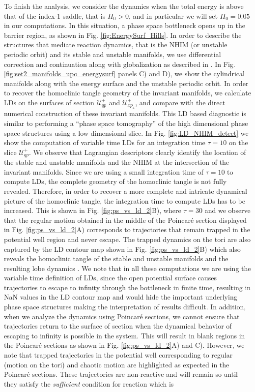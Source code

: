 \documentclass[8pt]{article}
\begin{document}
To finish the analysis, we consider the dynamics when the total energy is above that of the index-1 saddle, that is $H_0 > 0$, and in particular we will set $H_0 = 0.05$ in our computations. In this situation, a phase space bottleneck opens up in the barrier region, as shown in Fig. \ref{fig:EnergySurf_Hills}. In order to describe the structures that mediate reaction dynamics, that is the NHIM (or unstable periodic orbit) and its stable and unstable manifolds, we use differential correction and continuation along with globalization as described in \cite{Koon2011,naik2017geometry,naik2019b,GG2019}. In Fig. \ref{fig:set2_manifolds_upo_energysurf} panels C) and D), we show the cylindrical manifolds along with the energy surface and the unstable periodic orbit. In order to recover the homoclinic tangle geometry of the invariant manifolds, we calculate LDs on the surfaces of section $\mathcal{U}^{+}_{qp}$ and $\mathcal{U}^{+}_{xp_x}$, and compare with the direct numerical construction of these invariant manifolds. This LD based diagnostic is similar to performing a ``phase space tomography'' of the high dimensional phase space structures using a low dimensional slice. In Fig. \ref{fig:LD_NHIM_detect} we show the computation of variable time LDs for an integration time $\tau = 10$ on the slice $\mathcal{U}^{+}_{qp}$. We observe that Lagrangian descriptors clearly identify the location of the stable and unstable manifolds and the NHIM at the intersection of the invariant manifolds. Since we are using a small integration time of $\tau = 10$ to compute LDs, the complete geometry of the homoclinic tangle is not fully revealed. Therefore, in order to recover a more complete and intricate dynamical picture of the homoclinic tangle, the integration time to compute LDs has to be increased. This is shown in Fig. \ref{fig:ps_vs_ld_2}B), where $\tau = 30$ and we observe that the regular motion obtained in the middle of the Poincar\'e section displayed in Fig. \ref{fig:ps_vs_ld_2}A) corresponds to trajectories that remain trapped in the potential well region and never escape. The trapped dynamics on the tori are also captured by the LD contour map shown in Fig. \ref{fig:ps_vs_ld_2}B) which also reveals the homoclinic tangle of the stable and unstable manifolds and the resulting lobe dynamics \cite{beigie1992}. We note that in all these computations we are using the variable time definition of LDs, since the open potential surface causes trajectories to escape to infinity through the bottleneck in finite time, resulting in NaN values in the LD contour map and would hide the important underlying phase space structures making the interpretation of results difficult. In addition, when we analyze the dynamics using Poincar\'e sections, we cannot ensure that trajectories return to the surface of section when the dynamical behavior of escaping to infinity is possible in the system. This will result in blank regions in the Poincar\'e sections as shown in Fig. \ref{fig:ps_vs_ld_2}A) and C). However, we note that trapped trajectories in the potential well corresponding to regular (motion on the tori) and chaotic motion are highlighted as expected in the Poincar\'e sections. These trajectories are non-reactive and will remain so until they satisfy the \textit{sufficient} condition for reaction which is 
\end{document}
